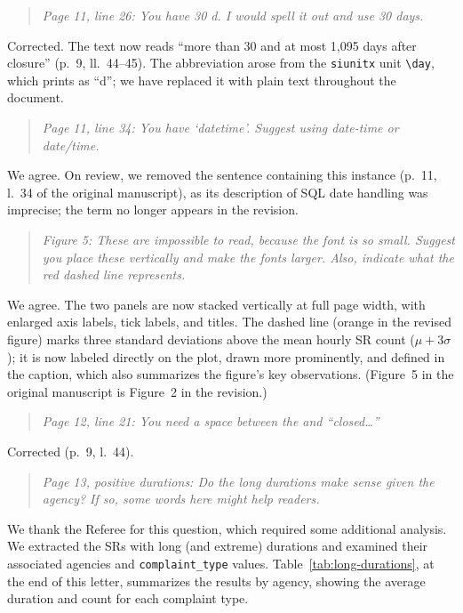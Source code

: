 \documentclass[12pt]{article}
\newenvironment{comment}
{\begin{quotation}\noindent\small\itshape\color{darkblue}\ignorespaces}
{\end{quotation}}
\begin{document}
\FloatBarrier
\begin{comment}
Page 11, line 26: You have 30 d. I would spell it out and
use 30 days.
\end{comment}

Corrected. The text now reads ``more than 30 and at most 1,095 days
after closure'' (p.~9, ll.~44--45). The abbreviation arose from the \texttt{siunitx}
unit \verb|\day|, which prints as ``d''; we have replaced it with plain
text throughout the document.

\FloatBarrier
\begin{comment}
Page 11, line 34: You have `datetime'. Suggest using
date-time or date/time.
\end{comment}

We agree. On review, we removed the sentence containing this instance
(p.~11, l.~34 of the original manuscript), as its description of SQL
date handling was imprecise; the term no longer appears in the
revision.

\FloatBarrier
\begin{comment}
Figure 5: These are impossible to read, because the font is
so small. Suggest you place these vertically and make the fonts larger.
Also, indicate what the red dashed line represents.
\end{comment}

We agree. The two panels are now stacked vertically at full page
width, with enlarged axis labels, tick labels, and titles. The dashed
line (orange in the revised figure) marks three standard deviations
above the mean hourly SR count ($\mu + 3\sigma$); it is now labeled directly on the plot, drawn
more prominently, and defined in the caption, which also summarizes
the figure's key observations. (Figure~5 in the original manuscript
is Figure~2 in the revision.)

\FloatBarrier
\begin{comment}
Page 12, line 21: You need a space between the and
``closed\ldots''
\end{comment}

Corrected (p.~9, l.~44).

\FloatBarrier
\begin{comment}
Page 13, positive durations: Do the long durations make
sense given the agency? If so, some words here might help readers.
\end{comment}

We thank the Referee for this question, which required some additional
analysis. We extracted the SRs with long (and extreme) durations and
examined their associated agencies and \texttt{complaint\_type} values.
Table~\ref{tab:long-durations}, at the end of this letter, summarizes
the results by agency, showing the average duration and count for each
complaint type.
\end{document}
